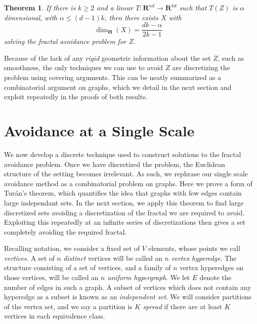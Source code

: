 \documentclass{article}
\theoremstyle{plain}
\theoremstyle{plain}
\newtheorem{theorem}{Theorem}
\begin{document}
\begin{theorem}
	If there is $k \geq 2$ and a linear $T: \mathbf{R}^{nd} \to \mathbf{R}^{kd}$ such that $T(Z)$ is $\alpha$ dimensional, with $\alpha \leq (d-1)k$, then there exists $X$ with
	\[ \dim_{\mathbf{H}}(X) = \frac{dk - \alpha}{2k-1} \]
	solving the fractal avoidance problem for $Z$.
\end{theorem}

Because of the lack of any {\it rigid} geometric information about the set $Z$, such as smoothness, the only techniques we can use to avoid $Z$ are discretizing the problem using covering arguments. This can be neatly summarized as a combinatorial argument on graphs, which we detail in the next section and exploit repeatedly in the proofs of both results.



\section{Avoidance at a Single Scale}

We now develop a discrete technique used to construct solutions to the fractal avoidance problem. Once we have discretized the problem, the Euclidean structure of the setting becomes irrelevant. As such, we rephrase our single scale avoidance method as a combinatorial problem on graphs. Here we prove a form of Tur\'{a}n's theorem, which quantifies the idea that graphs with few edges contain large independant sets. In the next section, we apply this theorem to find large discretized sets avoiding a discretization of the fractal we are required to avoid. Exploiting this repeatedly at an infinite series of discretizations then gives a set completely avoiding the required fractal.

Recalling notation, we consider a fixed set of $V$ elements, whose points we call {\it vertices}. A set of $n$ {\it distinct} vertices will be called an {\it $n$ vertex hyperedge}. The structure consisting of a set of vertices, and a family of $n$ vertex hyperedges on those vertices, will be called an {\it $n$ uniform hypergraph}. We let $E$ denote the number of edges in such a graph. A subset of vertices which does not contain any hyperedge as a subset is known as an {\it independent set}. We will consider partitions of the vertex set, and we say a partition is {\it $K$ spread} if there are at least $K$ vertices in each equivalence class.
\end{document}

